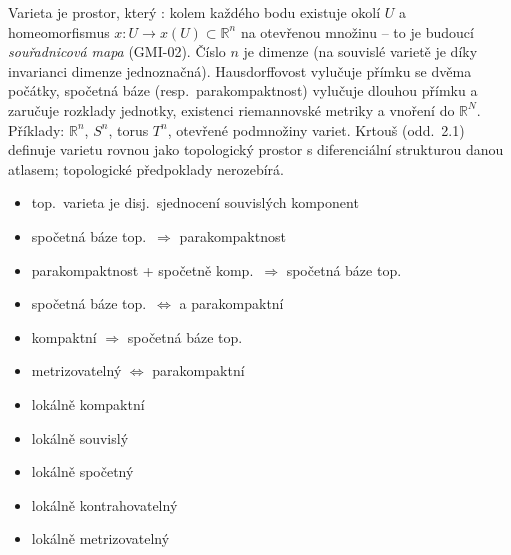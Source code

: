 \begin{vysvetleni}
Varieta je prostor, který : kolem každého bodu existuje okolí $U$ a homeomorfismus $x:U\to x(U)\subset\mathbb{R}^n$ na otevřenou množinu -- to je budoucí \emph{souřadnicová mapa} (GMI-02). Číslo $n$ je dimenze (na souvislé varietě je díky invarianci dimenze jednoznačná). Hausdorffovost vylučuje přímku se dvěma počátky, spočetná báze (resp.\ parakompaktnost) vylučuje dlouhou přímku a zaručuje rozklady jednotky, existenci riemannovské metriky a vnoření do $\mathbb{R}^N$. Příklady: $\mathbb{R}^n$, $S^n$, torus $T^n$, otevřené podmnožiny variet. Krtouš (odd.~2.1) definuje varietu rovnou jako topologický prostor s diferenciální strukturou danou atlasem; topologické předpoklady nerozebírá.
\end{vysvetleni}

\begin{veta}
\begin{itemize}[nosep]
  \item top.\ varieta je disj.\ sjednocení souvislých komponent
  \item spočetná báze top.\ $\Rightarrow$ parakompaktnost
  \item parakompaktnost + spočetně komp.\ $\Rightarrow$ spočetná báze top.
  \item spočetná báze top.\ $\Leftrightarrow$  a parakompaktní
  \item kompaktní $\Rightarrow$ spočetná báze top.
  \item metrizovatelný $\Leftrightarrow$ parakompaktní
  \item lokálně kompaktní
  \item lokálně souvislý
  \item lokálně spočetný
  \item lokálně kontrahovatelný
  \item lokálně metrizovatelný
\end{itemize}
\end{veta}

